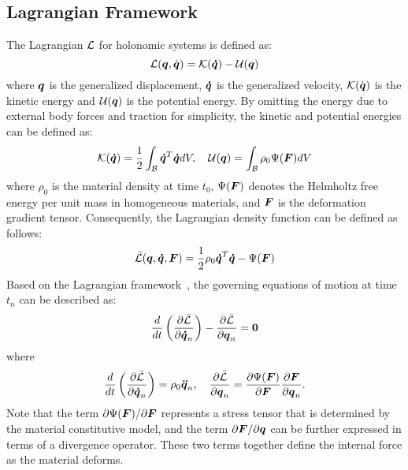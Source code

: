 \subsection{Lagrangian Framework}
The Lagrangian $\mathcal{L}$ for holonomic systems is defined as:
\begin{equation}
\f{L}(\bs{q},\dot{\bs{q}})=\f{K}(\bs{\dot{q}})-\f{U}(\bs{q}) %
\end{equation}
where $\boldsymbol{q}$ is the generalized displacement, $\boldsymbol{\dot{q}}$ is the generalized velocity, $\mathcal{K}(\dot{\boldsymbol{q}})$ is the kinetic energy and $\mathcal{U}(\boldsymbol{q})$ is the potential energy. By omitting the energy due to external body forces and traction for simplicity, the kinetic and potential energies can be defined as:
\begin{equation}
\mathcal{K}(\boldsymbol{\dot{q}})=\frac{1}{2}\int_{\mathcal{B}}\boldsymbol{\dot{q}}^T\boldsymbol{\dot{q}} dV,\quad
\mathcal{U}(\boldsymbol{q})=\int_{\mathcal{B}}\rho_0\Psi(\boldsymbol{F})dV
\end{equation}
where $\rho_0$ is the material density at time $t_0$, 
$\Psi(\boldsymbol{F})$ denotes the Helmholtz free energy per unit mass in homogeneous materials, and $\boldsymbol{F}$ is the deformation gradient tensor. Consequently, the Lagrangian density function can be defined as follows:
\begin{equation}
     \bar{\mathcal{L}}(\boldsymbol{q},\boldsymbol{\dot{q}}, \boldsymbol{F})=\frac{1}{2}\rho_0\boldsymbol{\dot{q}}^T\boldsymbol{\dot{q}} -\Psi(\boldsymbol{F})
\end{equation}
Based on the Lagrangian framework~\cite{Zienkiewicz:1977:FEM}, the governing equations of motion at time $t_n$ can be described as:
\begin{equation}
   \frac{d}{dt}\left(\frac{\partial \bar{\mathcal{L}}}{\partial \boldsymbol{\dot{q}}_n}\right)-\frac{\partial \bar{\mathcal{L}}}{\partial \boldsymbol{q}_n}=\boldsymbol{0}
    \label{eq:lagrangian}
\end{equation}
where
\begin{equation}
\frac{d}{dt}\left(\frac{\p \bar{\f{L}}}{\p \bs{\dot{q}}_n}\right)=\rho_0 \bs{\ddot{q}}_n, \quad \frac{\p \bar{\f{L}}}{\p \bs{q}_n}=\frac{\p\Psi(\bs{F})}{\p\bs{F}}\frac{\p\bs{F}}{\p \bs{q}_n}.%
\end{equation}
Note that the term ${\partial\Psi(\boldsymbol{F})}/{\partial\boldsymbol{F}}$ represents a stress tensor that is determined by the material constitutive model, and the term ${\partial \boldsymbol{F}}/{\partial\boldsymbol{q}}$ can be further expressed in terms of a divergence operator. These two terms together define the internal force as the material deforms. %

